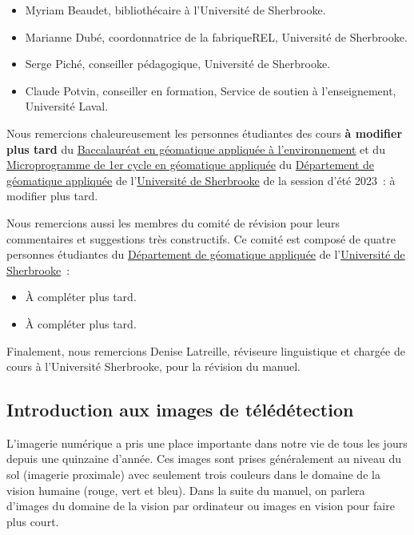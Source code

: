 \documentclass[
]{article}
\begin{document}
\begin{itemize}
\item
  Myriam Beaudet, bibliothécaire à l'Université de Sherbrooke.
\item
  Marianne Dubé, coordonnatrice de la fabriqueREL, Université de
  Sherbrooke.
\item
  Serge Piché, conseiller pédagogique, Université de Sherbrooke.
\item
  Claude Potvin, conseiller en formation, Service de soutien à
  l'enseignement, Université Laval.
\end{itemize}

Nous remercions chaleureusement les personnes étudiantes des cours
\textbf{à modifier plus tard} du
\href{https://www.usherbrooke.ca/admission/programme/271/baccalaureat-en-geomatiqueappliquee-a-lenvironnement/}{Baccalauréat
en géomatique appliquée à l'environnement} et du
\href{https://www.usherbrooke.ca/admission/programme/429/microprogramme-de-1er-cycleen-geomatique-appliquee/}{Microprogramme
de 1er cycle en géomatique appliquée} du
\href{https://www.usherbrooke.ca/geomatique/}{Département de géomatique
appliquée} de l'\href{https://www.usherbrooke.ca/}{Université de
Sherbrooke} de la session d'été 2023~: à modifier plus tard.

Nous remercions aussi les membres du comité de révision pour leurs
commentaires et suggestions très constructifs. Ce comité est composé de
quatre personnes étudiantes du
\href{https://www.usherbrooke.ca/geomatique/}{Département de géomatique
appliquée} de l'\href{https://www.usherbrooke.ca/}{Université de
Sherbrooke}~:

\begin{itemize}
\item
  À compléter plus tard.
\item
  À compléter plus tard.
\end{itemize}

Finalement, nous remercions Denise Latreille, réviseure linguistique et
chargée de cours à l'Université Sherbrooke, pour la révision du manuel.

\label{sect006}
\subsection*{Introduction aux images de
télédétection}\label{introduction-aux-images-de-tuxe9luxe9duxe9tection}

L'imagerie numérique a pris une place importante dans notre vie de tous
les jours depuis une quinzaine d'année. Ces images sont prises
généralement au niveau du sol (imagerie proximale) avec seulement trois
couleurs dans le domaine de la vision humaine (rouge, vert et bleu).
Dans la suite du manuel, on parlera d'images du domaine de la vision par
ordinateur ou images en vision pour faire plus court.
\end{document}
